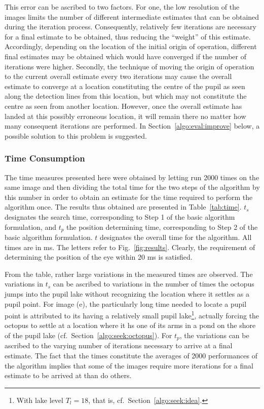 This error can be ascribed to two factors.  For one, the low
resolution of the images limits the number of different intermediate
estimates that can be obtained during the iteration process.
Consequently, relatively few iterations are necessary for a final
estimate to be obtained, thus reducing the ``weight'' of this
estimate.  Accordingly, depending on the location of the initial
origin of operation, different final estimates may be obtained which
would have converged if the number of iterations were higher.
Secondly, the technique of moving the origin of operation to the
current overall estimate every two iterations may cause the overall
estimate to converge at a location constituting the centre of the
pupil as seen along the detection lines from this location, but which
may not constitute the centre as seen from another location.  However,
once the overall estimate has landed at this possibly erroneous
location, it will remain there no matter how many consequent
iterations are performed.  In Section~\ref{algo:eval:improve} below, a
possible solution to this problem is suggested.

\subsubsection{Time Consumption}

The time measures presented here were obtained by letting {\octopus}
run 2000 times on the same image and then dividing the total time for
the two steps of the algorithm by this number in order to obtain an
estimate for the time required to perform the algorithm once.  The
results thus obtained are presented in Table~\ref{tab:time}.  $t_{s}$
designates the search time, corresponding to Step 1 of the basic
algorithm formulation, and $t_{p}$ the position determining time,
corresponding to Step 2 of the basic algorithm formulation.  $t$
designates the overall time for the algorithm.  All times are in ms.
The letters refer to Fig.~\ref{fig:results}.  Clearly, the requirement
of determining the position of the eye within 20 ms is satisfied.

From the table, rather large variations in the measured times are
observed.  The variations in $t_{s}$ can be ascribed to variations in
the number of times the octopus jumps into the pupil lake without
recognizing the location where it settles as a pupil point.  For image
(e), the particularly long time needed to locate a pupil point is
attributed to its having a relatively small pupil lake\footnote{With
  lake level $T_{l}=18$, that is, cf.\ Section~\ref{algo:seek:idea}.},
actually forcing the octopus to settle at a location where it hs one
of its arms in a pond on the shore of the pupil lake (cf.\ 
Section~\ref{algo:seek:octopus}).  For $t_{p}$, the variations can be
ascribed to the varying number of iterations necessary to arrive at a
final estimate.  The fact that the times constitute the averages of
2000 performances of the algorithm implies that some of the images
require more iterations for a final estimate to be arrived at than do
others.

